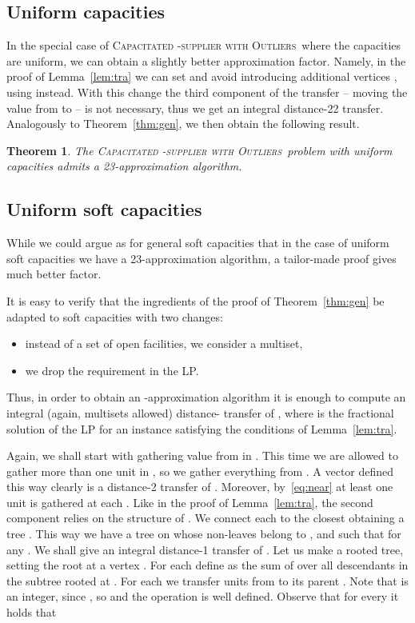 \documentclass{article}
\newcommand{\fullsup}{\textsc{Capacitated} -\textsc{supplier with Outliers}}
\theoremstyle{plain}
\newtheorem{theorem}{Theorem}
\theoremstyle{definition}
\begin{document}
\subsection{Uniform capacities}
In the special case of \fullsup\  where the capacities are uniform,
we can obtain a slightly better approximation factor.
Namely, in the proof of Lemma~\ref{lem:tra} 
we can set  and avoid introducing additional vertices , using  instead. With this change the
third component of the transfer -- moving the value from  to  -- is not
necessary, thus we get an integral distance-22 transfer. Analogously to
Theorem~\ref{thm:gen}, we then obtain the following result.
\begin{theorem}
The \fullsup\  problem with uniform capacities admits a 23-approximation algorithm.
\end{theorem}

\subsection{Uniform soft capacities}
While we could argue as for general soft capacities that in the case of uniform
soft capacities we have a 23-approximation algorithm, a tailor-made proof gives
much better factor.

It is easy to verify that the ingredients of the proof of
Theorem~\ref{thm:gen} be adapted to soft capacities with two changes:
\begin{itemize}
  \item instead of a set of open facilities, we consider a multiset,
  \item we drop the  requirement in the LP.
\end{itemize}
Thus, in order to obtain an -approximation algorithm it is enough to compute an integral (again, multisets
allowed) distance- transfer of , where  is the fractional solution
of the LP for an instance satisfying the conditions of Lemma~\ref{lem:tra}.

Again, we shall start with gathering value from  in . This time we
are allowed to gather more than one unit in , so we gather everything from
. A vector  defined this way clearly is a distance-2
transfer of . Moreover, by~\eqref{eq:near} at least one unit is gathered
at each . Like in the proof of Lemma~\ref{lem:tra}, the second component
relies on the structure of .
We connect each  to the closest  obtaining a tree .
This way we have a tree on  whose non-leaves belong to , and
such that  for any .
We shall give an integral distance-1 transfer  of .
Let us make  a rooted tree, setting the root at a vertex .
For each  define  as the sum of  over all descendants  in the
subtree rooted at . 
For each  we transfer  units from  to
its parent .  Note that  is an integer, since , so  and the operation is well defined. 
Observe that for every  it holds that
\end{document}
